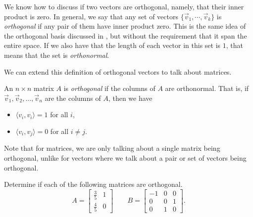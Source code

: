 \documentclass{ximera}
\begin{document}
We know how to discuss if two vectors are orthogonal, namely, that their inner product is zero. In general, we say that any set of vectors $\{\vec{v}_1, \cdots, \vec{v}_k\}$ is \emph{orthogonal} if any pair of them have inner product zero. This is the same idea of the orthogonal basis discussed in , but without the requirement that it span the entire space. If we also have that the length of each vector in this set is $1$, that means that the set is \emph{orthonormal}. 

We can extend this definition of orthogonal vectors to talk about matrices. 

\begin{definition}
    An $n\times n$ matrix $A$ is \emph{orthogonal} if the columns of $A$ are orthonormal. That is, if $\vec{v}_1, \vec{v}_2, ..., \vec{v}_n$ are the columns of $A$, then we have
    \begin{itemize}
        \item $\langle v_i, v_i \rangle = 1$ for all $i$,
        \item $\langle v_i, v_j \rangle = 0$ for all $i \neq j$. 
    \end{itemize}
\end{definition}

Note that for matrices, we are only talking about a single matrix being orthogonal, unlike for vectors where we talk about a pair or set of vectors being orthogonal. 

\begin{example}
    Determine if each of the following matrices are orthogonal.
    \[ 
        A = 
        \begin{bmatrix} 
            \frac{3}{5} & 1 \\ 
            \frac{4}{5} & 0 
        \end{bmatrix} 
        \qquad B = 
        \begin{bmatrix} 
            -1 & 0 & 0 \\ 
            0 & 0 & 1 \\ 
            0 & 1  & 0 
        \end{bmatrix}.
    \]
\end{example}
\end{document}
